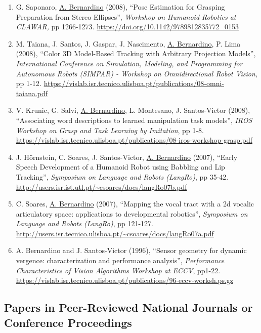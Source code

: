 \documentclass[
]{article}
\begin{document}
\begin{enumerate}
{  Human-Robot Interaction (HRI), Late Breaking Report session,} pp
  243-244. \url{https://doi.org/10.1145/1957656.1957752}
\item
  G. Saponaro, \ul{A. Bernardino} (2008), ``Pose Estimation for Grasping
  Preparation from Stereo Ellipses'', \emph{Workshop on Humanoid
  Robotics at CLAWAR,} pp 1266-1273.
  \url{https://doi.org/10.1142/9789812835772_0153}~
\item
  M. Taiana, J. Santos, J. Gaspar, J. Nascimento, \ul{A. Bernardino}, P.
  Lima (2008), ``Color 3D Model-Based Tracking with Arbitrary Projection
  Models'', \emph{International Conference on Simulation, Modeling, and
  Programming for Autonomous Robots (SIMPAR) - Workshop on
  Omnidirectional Robot Vision,} pp 1-12\emph{.}
  \url{https://vislab.isr.tecnico.ulisboa.pt/publications/08-omni-taiana.pdf}~
\item
  V. Krunic, G. Salvi, \ul{A. Bernardino}, L. Montesano, J.
  Santos-Victor (2008), ``Associating word descriptions to learned
  manipulation task models'', \emph{IROS Workshop on Grasp and Task
  Learning by Imitation}, pp 1-8.
  \url{https://vislab.isr.tecnico.ulisboa.pt/publications/08-iros-workshop-grasp.pdf}
\item
  J. Hörnstein, C. Soares, J. Santos-Victor, \ul{A. Bernardino}
  \textbar(2007), ``Early Speech Development of a Humanoid Robot using
  Babbling and Lip Tracking'', \emph{Symposium on Language and Robots
  (LangRo)}, pp 35-42.
  \url{http://users.isr.ist.utl.pt/~csoares/docs/langRo07b.pdf}~
\item
  C. Soares, \ul{A. Bernardino} (2007), ``Mapping the vocal tract with a
  2d vocalic articulatory space: applications to developmental
  robotics'', \emph{Symposium on Language and Robots (LangRo)}, pp
  121-127.
  \url{http://users.isr.tecnico.ulisboa.pt/~csoares/docs/langRo07a.pdf}~
\item
  A. Bernardino and J. Santos-Victor (1996), ``Sensor geometry for
  dynamic vergence: characterization and performance analysis'',
  \emph{Performance Characteristics of Vision Algorithms Workshop at
  ECCV}, pp1-22.
  \url{https://vislab.isr.tecnico.ulisboa.pt/publications/96-eccv-worksh.ps.gz}
\end{enumerate}

\subsection{Papers in Peer-Reviewed National Journals or Conference
Proceedings}\label{papers-in-peer-reviewed-national-journals-or-conference-proceedings}
\end{document}

